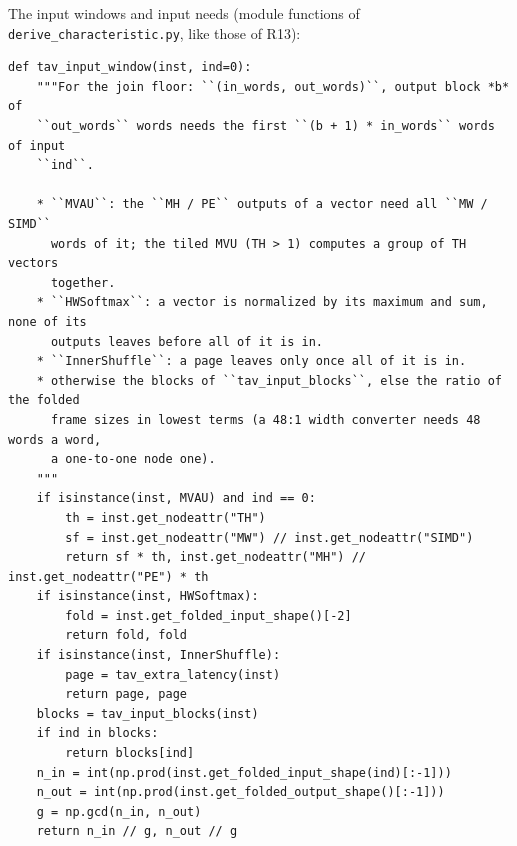 \documentclass[10pt,a4paper]{article}
\newcommand{\code}[1]{\texttt{#1}}
\newcommand{\file}{\code{derive\_characteristic.py}}
\begin{document}
The input windows and input needs (module functions of \file{}, like those of R13):

\begin{lstlisting}[firstnumber=432,title={\texttt{src/finn/transformation/fpgadataflow/derive\_characteristic.py}, lines 432--463}]
def tav_input_window(inst, ind=0):
    """For the join floor: ``(in_words, out_words)``, output block *b* of
    ``out_words`` words needs the first ``(b + 1) * in_words`` words of input
    ``ind``.

    * ``MVAU``: the ``MH / PE`` outputs of a vector need all ``MW / SIMD``
      words of it; the tiled MVU (TH > 1) computes a group of TH vectors
      together.
    * ``HWSoftmax``: a vector is normalized by its maximum and sum, none of its
      outputs leaves before all of it is in.
    * ``InnerShuffle``: a page leaves only once all of it is in.
    * otherwise the blocks of ``tav_input_blocks``, else the ratio of the folded
      frame sizes in lowest terms (a 48:1 width converter needs 48 words a word,
      a one-to-one node one).
    """
    if isinstance(inst, MVAU) and ind == 0:
        th = inst.get_nodeattr("TH")
        sf = inst.get_nodeattr("MW") // inst.get_nodeattr("SIMD")
        return sf * th, inst.get_nodeattr("MH") // inst.get_nodeattr("PE") * th
    if isinstance(inst, HWSoftmax):
        fold = inst.get_folded_input_shape()[-2]
        return fold, fold
    if isinstance(inst, InnerShuffle):
        page = tav_extra_latency(inst)
        return page, page
    blocks = tav_input_blocks(inst)
    if ind in blocks:
        return blocks[ind]
    n_in = int(np.prod(inst.get_folded_input_shape(ind)[:-1]))
    n_out = int(np.prod(inst.get_folded_output_shape()[:-1]))
    g = np.gcd(n_in, n_out)
    return n_in // g, n_out // g
\end{lstlisting}
\end{document}
